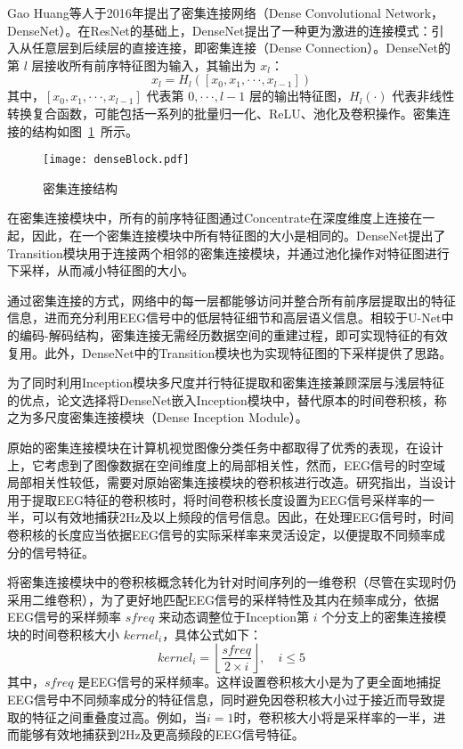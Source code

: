 Gao Huang等人于2016年提出了密集连接网络\cite{huang2017densely}（Dense Convolutional Network，DenseNet）。在ResNet的基础上，DenseNet提出了一种更为激进的连接模式：引入从任意层到后续层的直接连接，即密集连接（Dense Connection）。DenseNet的第 \(l\) 层接收所有前序特征图为输入，其输出为 \(x_l\)：
\begin{equation}
  x_l = H_l([x_0, x_1, ···, x_{l-1}])
  \label{eq:dense-conn}
\end{equation}
其中，\([x_0, x_1, ···, x_{l-1}]\) 代表第 \(0, ···, l-1\) 层的输出特征图，\(H_l(·)\) 代表非线性转换复合函数，可能包括一系列的批量归一化、ReLU、池化及卷积操作。密集连接的结构如图~\ref{fig:denseBlock}~所示。
\begin{figure}
  \centering
  \texttt{[image: denseBlock.pdf]}
  \caption{密集连接结构\cite{huang2017densely}}
  \label{fig:denseBlock}
\end{figure}

在密集连接模块中，所有的前序特征图通过Concentrate在深度维度上连接在一起，因此，在一个密集连接模块中所有特征图的大小是相同的。DenseNet提出了Transition模块用于连接两个相邻的密集连接模块，并通过池化操作对特征图进行下采样，从而减小特征图的大小。

通过密集连接的方式，网络中的每一层都能够访问并整合所有前序层提取出的特征信息，进而充分利用EEG信号中的低层特征细节和高层语义信息。相较于U-Net中的编码-解码结构，密集连接无需经历数据空间的重建过程，即可实现特征的有效复用。此外，DenseNet中的Transition模块也为实现特征图的下采样提供了思路。

为了同时利用Inception模块多尺度并行特征提取和密集连接兼顾深层与浅层特征的优点，论文选择将DenseNet嵌入Inception模块中，替代原本的时间卷积核，称之为多尺度密集连接模块（Dense Inception Module）。

原始的密集连接模块在计算机视觉图像分类任务中都取得了优秀的表现，在设计上，它考虑到了图像数据在空间维度上的局部相关性，然而，EEG信号的时空域局部相关性较低，需要对原始密集连接模块的卷积核进行改造。研究指出\cite{lawhern2018eegnet}，当设计用于提取EEG特征的卷积核时，将时间卷积核长度设置为EEG信号采样率的一半，可以有效地捕获2Hz及以上频段的信号信息。因此，在处理EEG信号时，时间卷积核的长度应当依据EEG信号的实际采样率来灵活设定，以便提取不同频率成分的信号特征。

将密集连接模块中的卷积核概念转化为针对时间序列的一维卷积（尽管在实现时仍采用二维卷积），为了更好地匹配EEG信号的采样特性及其内在频率成分，依据EEG信号的采样频率 \(sfreq\) 来动态调整位于Inception第 \(i\) 个分支上的密集连接模块的时间卷积核大小 \(kernel_i\)，具体公式如下：
\begin{equation}
    kernel_i = \left \lfloor \frac{sfreq}{2 \times i} \right \rfloor , \quad i \le 5
    \label{eq:kernel_cal}
\end{equation}
其中，\(sfreq\) 是EEG信号的采样频率。这样设置卷积核大小是为了更全面地捕捉EEG信号中不同频率成分的特征信息，同时避免因卷积核大小过于接近而导致提取的特征之间重叠度过高。例如，当\(i=1\)时，卷积核大小将是采样率的一半，进而能够有效地捕获到2Hz及更高频段的EEG信号特征。

